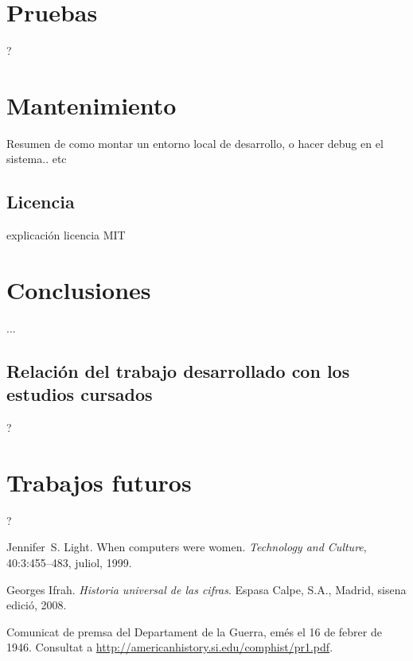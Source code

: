 \documentclass[11pt,spanish,listoffigures,listoftables]{tfgetsinf}
\begin{document}
\chapter{Pruebas}

?

\chapter{Mantenimiento}

Resumen de como montar un entorno local de desarrollo, o hacer debug en el sistema.. etc 

\section{Licencia}

explicación licencia MIT 

\chapter{Conclusiones}

... \par

\section{Relación del trabajo desarrollado con los estudios cursados}

?

\chapter{Trabajos futuros}

?

\begin{thebibliography}{10}

   Jennifer~S. Light.
   \newblock When computers were women.
   \newblock \textit{Technology and Culture}, 40:3:455--483, juliol, 1999.

   Georges Ifrah.
   \newblock \textit{Historia universal de las cifras}.
   \newblock Espasa Calpe, S.A., Madrid, sisena edició, 2008.

   Comunicat de premsa del Departament de la Guerra, 
   emés el 16 de febrer de 1946. 
   \newblock Consultat a 
   \url{http://americanhistory.si.edu/comphist/pr1.pdf}.

\end{thebibliography}
\cleardoublepage
\end{document}
